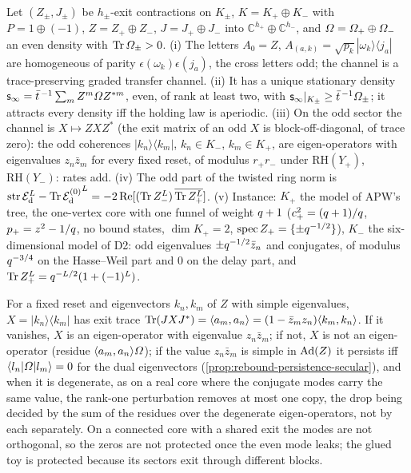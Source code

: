 \begin{theorem}
\label{thm:glued-graded-toy}
Let $(Z_\pm,J_\pm)$ be $h_\pm$-exit contractions on $K_\pm$, $K = K_+\oplus K_-$ with $P = 1\oplus(-1)$,
$Z = Z_+\oplus Z_-$, $J = J_+\oplus J_-$ into $\mathbb C^{h_+}\oplus\mathbb C^{h_-}$, and $\varOmega = \varOmega_+\oplus\varOmega_-$
an even density with $\operatorname{Tr}\varOmega_\pm>0$. (i) The letters $A_0 = Z$, $A_{(a,k)} = \sqrt{p_k}|\omega_k\rangle\langle j_a|$
are homogeneous of parity $\epsilon(\omega_k)\epsilon(j_a)$, the cross letters odd; the channel is a
trace-preserving graded transfer channel. (ii) It has a unique stationary density
$\mathsf s_\infty = \bar t^{\,-1}\sum_mZ^m\varOmega Z^{*m}$, even, of rank at least two, with $\mathsf s_\infty|_{K_\pm}\ge\bar t^{\,-1}\varOmega_\pm$;
it attracts every density iff the holding law is aperiodic. (iii) On the odd sector the channel is
$X\mapsto ZXZ^{*}$ (the exit matrix of an odd $X$ is block-off-diagonal, of trace zero): the odd coherences
$|k_n\rangle\langle k_m|$, $k_n\in K_-$, $k_m\in K_+$, are eigen-operators with eigenvalues $z_n\bar z_m$ for every
fixed reset, of modulus $r_+r_-$ under $\mathrm{RH}(Y_+)$, $\mathrm{RH}(Y_-)$: rates add. (iv) The odd part of the
twisted ring norm is $\operatorname{str}\mathcal E_{\mathrm d}^L-\operatorname{Tr}{\mathcal E_{\mathrm d}^{(0)}}^L = -2\operatorname{Re}[(\operatorname{Tr} Z_-^L)\,\overline{\operatorname{Tr} Z_+^L}]$. (v) Instance: $K_+$ the
model of APW's tree, the one-vertex core with one funnel of weight $q+1$ ($c_+^2 = (q+1)/q$,
$p_+ = z^2-1/q$, no bound states, $\dim K_+ = 2$, $\operatorname{spec}Z_+ = \{\pm q^{-1/2}\}$), $K_-$ the
six-dimensional model of D2: odd eigenvalues $\pm q^{-1/2}\bar z_n$ and conjugates, of modulus $q^{-3/4}$ on
the Hasse--Weil part and $0$ on the delay part, and $\operatorname{Tr} Z_+^L = q^{-L/2}(1+(-1)^L)$.
\end{theorem}

\begin{proposition}
\label{prop:shared-exit-tradeoff}
For a fixed reset and eigenvectors $k_n,k_m$ of $Z$ with simple eigenvalues, $X = |k_n\rangle\langle k_m|$ has
exit trace $\operatorname{Tr}(JXJ^{*}) = \langle a_m,a_n\rangle = (1-\bar z_mz_n)\langle k_m,k_n\rangle$. If it vanishes, $X$ is an
eigen-operator with eigenvalue $z_n\bar z_m$; if not, $X$ is not an eigen-operator (residue
$\langle a_m,a_n\rangle\varOmega$); if the value $z_n\bar z_m$ is simple in $\operatorname{Ad}(Z)$ it persists iff $\langle l_n|\varOmega|l_m\rangle = 0$
for the dual eigenvectors (\cref{prop:rebound-persistence-secular}), and when it is degenerate, as on a real core where
the conjugate modes carry the same value, the rank-one perturbation removes at most one copy, the drop being decided
by the sum of the residues over the degenerate eigen-operators, not by each separately. On a
connected core with a shared exit the modes are not orthogonal, so the zeros are not protected once the even
mode leaks; the glued toy is protected because its sectors exit through different blocks.
\end{proposition}

